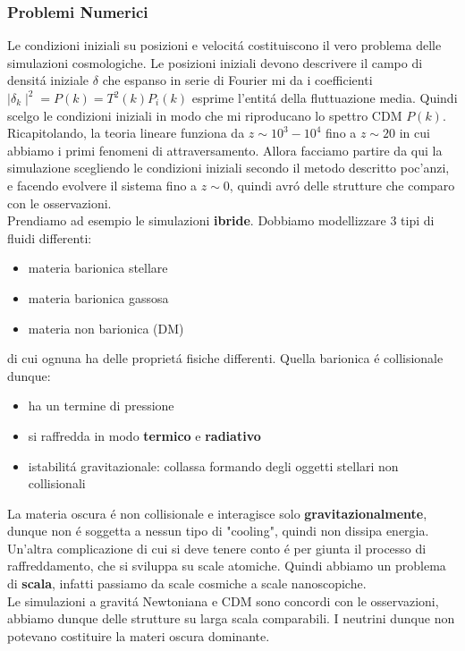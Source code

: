 \documentclass[12pt, a4paper]{article}
\begin{document}
\subsubsection{Problemi Numerici}
Le condizioni iniziali su posizioni e velocit\'{a} costituiscono il vero problema delle simulazioni cosmologiche. Le posizioni iniziali devono descrivere il campo di densit\'{a} iniziale $\delta$ che espanso in serie di Fourier mi da i coefficienti $\mid \delta_k\mid^2=P(k)=T^2(k)P_i(k)$ esprime l'entit\'{a} della fluttuazione media. Quindi scelgo le condizioni iniziali in modo che mi riproducano lo spettro CDM $P(k)$.\\
Ricapitolando, la teoria lineare funziona da $z\sim 10^3-10^4$ fino a $z\sim 20$ in cui abbiamo i primi fenomeni di attraversamento. Allora facciamo partire da qui la simulazione scegliendo le condizioni iniziali secondo il metodo descritto poc'anzi, e facendo evolvere il sistema fino a $z\sim 0$, quindi avr\'{o} delle strutture che comparo con le osservazioni.\\
Prendiamo ad esempio le simulazioni \textbf{ibride}. Dobbiamo modellizzare 3 tipi di fluidi differenti:
\begin{itemize}
\item materia barionica stellare
\item materia barionica gassosa
\item materia non barionica (DM)
\end{itemize}
di cui ognuna ha delle propriet\'{a} fisiche differenti. Quella barionica \'{e} collisionale dunque:
\begin{itemize}
\item ha un termine di pressione
\item si raffredda in modo \textbf{termico} e \textbf{radiativo}
\item istabilit\'{a} gravitazionale: collassa formando degli oggetti stellari non collisionali
\end{itemize}
La materia oscura \'{e} non collisionale e interagisce solo \textbf{gravitazionalmente}, dunque non \'{e} soggetta a nessun tipo di "cooling", quindi non dissipa energia. Un'altra complicazione di cui si deve tenere conto \'{e} per giunta il processo di raffreddamento, che si sviluppa su scale atomiche. Quindi abbiamo un problema di \textbf{scala}, infatti passiamo da scale cosmiche a scale nanoscopiche.\\
Le simulazioni a gravit\'{a} Newtoniana e CDM sono concordi con le osservazioni, abbiamo dunque delle strutture su larga scala comparabili. I neutrini dunque non potevano costituire la materi oscura dominante.
\newpage
\end{document}
